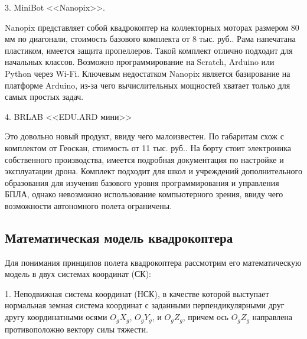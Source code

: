3. MiniBot <<Nanopix>>.

Nanopix представляет собой квадрокоптер на коллекторных моторах размером 80 мм по диагонали, стоимость базового комплекта от 8 тыс. руб.. Рама напечатана пластиком, имеется защита пропеллеров. Такой комплект отлично подходит для начальных классов. Возможно программирование на Scratch, Arduino или Python через Wi-Fi. Ключевым недостатком Nanopix является базирование на платформе Arduino, из-за чего вычислительных мощностей хватает только для самых простых задач.

4. BRLAB <<EDU.ARD мини>>

Это довольно новый продукт, ввиду чего малоизвестен. По габаритам схож с комплектом от Геоскан, стоимость от 11 тыс. руб.. На борту стоит электроника собственного производства, имеется подробная документация по настройке и эксплуатации дрона. Комплект подходит для школ и учреждений дополнительного образования для изучения базового уровня программирования и управления БПЛА, однако невозможно использование компьютерного зрения, ввиду чего возможности автономного полета ограничены.

\subsection{Математическая модель квадрокоптера}

Для понимания принципов полета квадрокоптера рассмотрим его математическую модель в двух системах координат (СК):

1. Неподвижная система координат (НСК), в качестве которой выступает нормальная земная система координат с заданными перпендикулярными друг другу координатными осями \(O_{g}X_{g}\), \(O_{g}Y_{g}\), и \(O_{g}Z_{g}\), причем ось \(O_{g}Z_{g}\) направлена противоположно вектору силы тяжести.

